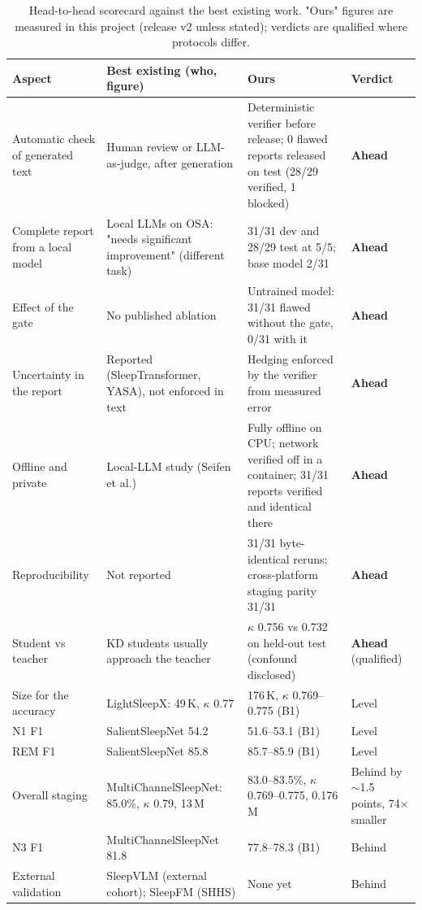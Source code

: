 \begin{table}[htbp]
\centering\scriptsize
\caption{Head-to-head scorecard against the best existing work. "Ours" figures are measured in this project (release v2 unless stated); verdicts are qualified where protocols differ.}
\label{tab:scorecard}
\begin{tabularx}{\textwidth}{p{}YYp{0.14\textwidth}}
\toprule
Aspect & Best existing (who, figure) & Ours & Verdict \\
\midrule
Automatic check of generated text & Human review or LLM-as-judge, after generation & Deterministic verifier before release; 0 flawed reports released on test (28/29 verified, 1 blocked) & \textbf{Ahead} \\
Complete report from a local model & Local LLMs on OSA: "needs significant improvement" (different task) & 31/31 dev and 28/29 test at 5/5; base model 2/31 & \textbf{Ahead} \\
Effect of the gate & No published ablation & Untrained model: 31/31 flawed without the gate, 0/31 with it & \textbf{Ahead} \\
Uncertainty in the report & Reported (SleepTransformer, YASA), not enforced in text & Hedging enforced by the verifier from measured error & \textbf{Ahead} \\
Offline and private & Local-LLM study (Seifen et al.) & Fully offline on CPU; network verified off in a container; 31/31 reports verified and identical there & \textbf{Ahead} \\
Reproducibility & Not reported & 31/31 byte-identical reruns; cross-platform staging parity 31/31 & \textbf{Ahead} \\
Student vs teacher & KD students usually approach the teacher & $\kappa$ 0.756 vs 0.732 on held-out test (confound disclosed) & \textbf{Ahead} (qualified) \\
Size for the accuracy & LightSleepX: 49\,K, $\kappa$ 0.77 & 176\,K, $\kappa$ 0.769--0.775 (B1) & Level \\
N1 F1 & SalientSleepNet 54.2 & 51.6--53.1 (B1) & Level \\
REM F1 & SalientSleepNet 85.8 & 85.7--85.9 (B1) & Level \\
Overall staging & MultiChannelSleepNet: 85.0\%, $\kappa$ 0.79, 13\,M & 83.0--83.5\%, $\kappa$ 0.769--0.775, 0.176\,M & Behind by $\sim$1.5 points, 74$\times$ smaller \\
N3 F1 & MultiChannelSleepNet 81.8 & 77.8--78.3 (B1) & Behind \\
External validation & SleepVLM (external cohort); SleepFM (SHHS) & None yet & Behind \\

\end{tabularx}
\end{table}
